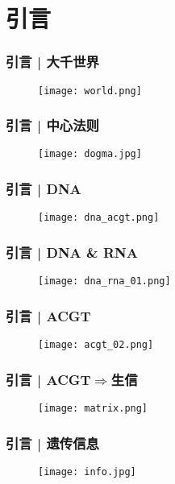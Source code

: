 \section{引言}
\begin{frame}
  \frametitle{引言 | 大千世界}
  \begin{figure}
    \centering
    \texttt{[image: world.png]}
  \end{figure}
\end{frame}

\begin{frame}
  \frametitle{引言 | 中心法则}
  \begin{figure}
    \centering
    \texttt{[image: dogma.jpg]}
  \end{figure}
\end{frame}

\begin{frame}
  \frametitle{引言 | DNA}
  \begin{figure}
    \centering
    \texttt{[image: dna\_acgt.png]}
  \end{figure}
\end{frame}

\begin{frame}
  \frametitle{引言 | DNA \& RNA}
  \begin{figure}
    \centering
    \texttt{[image: dna\_rna\_01.png]}
  \end{figure}
\end{frame}

\begin{frame}
  \frametitle{引言 | ACGT}
  \begin{figure}
    \centering
    \texttt{[image: acgt\_02.png]}
  \end{figure}
\end{frame}

\begin{frame}
  \frametitle{引言 | ACGT$\Rightarrow$生信}
  \begin{figure}
    \centering
    \texttt{[image: matrix.png]}
  \end{figure}
\end{frame}

\begin{frame}
  \frametitle{引言 | \alert{遗传信息}}
  \begin{figure}
    \centering
    \texttt{[image: info.jpg]}
  \end{figure}
\end{frame}

